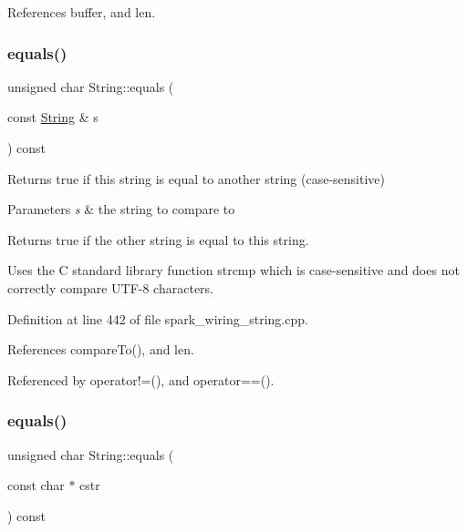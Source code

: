References buffer, and len.

\mbox{\label{class_string_a1f8b83b7dfd47de4062abc3d57e4c351}} 
\subsubsection{\texorpdfstring{equals()}{equals()}\hspace{0.1cm}{\footnotesize\ttfamily [1/2]}}
{\footnotesize\ttfamily unsigned char String\+::equals (\begin{DoxyParamCaption}\item[{const \hyperlink{class_string}{String} \&}]{s }\end{DoxyParamCaption}) const}



Returns true if this string is equal to another string (case-\/sensitive) 


\begin{DoxyParams}{Parameters}
{\em s} & the string to compare to\\
\hline
\end{DoxyParams}
\begin{DoxyReturn}{Returns}
true if the other string is equal to this string.
\end{DoxyReturn}
Uses the C standard library function strcmp which is case-\/sensitive and does not correctly compare U\+T\+F-\/8 characters. 

Definition at line 442 of file spark\+\_\+wiring\+\_\+string.\+cpp.



References compare\+To(), and len.



Referenced by operator!=(), and operator==().

\mbox{\label{class_string_add7c8de5fdbebf0fba593d97535228c2}} 
\subsubsection{\texorpdfstring{equals()}{equals()}\hspace{0.1cm}{\footnotesize\ttfamily [2/2]}}
{\footnotesize\ttfamily unsigned char String\+::equals (\begin{DoxyParamCaption}\item[{const char $\ast$}]{cstr }\end{DoxyParamCaption}) const}



